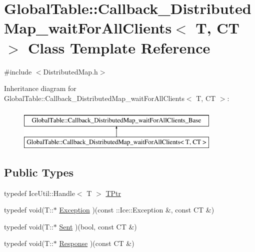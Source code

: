 \hypertarget{class_global_table_1_1_callback___distributed_map__wait_for_all_clients}{
\section{GlobalTable::Callback\_\-DistributedMap\_\-waitForAllClients$<$ T, CT $>$ Class Template Reference}
\label{class_global_table_1_1_callback___distributed_map__wait_for_all_clients}
}


{\ttfamily \#include $<$DistributedMap.h$>$}

Inheritance diagram for GlobalTable::Callback\_\-DistributedMap\_\-waitForAllClients$<$ T, CT $>$:\begin{figure}[H]
\begin{center}
\leavevmode
\includegraphics[height=2cm]{class_global_table_1_1_callback___distributed_map__wait_for_all_clients}
\end{center}
\end{figure}
\subsection*{Public Types}
\begin{DoxyCompactItemize}
\item 
typedef IceUtil::Handle$<$ T $>$ \hyperlink{class_global_table_1_1_callback___distributed_map__wait_for_all_clients_a0efb2e7297b9ccbba6e37fb4ce9a201e}{TPtr}
\item 
typedef void(T::$\ast$ \hyperlink{class_global_table_1_1_callback___distributed_map__wait_for_all_clients_a1e030c06ca5740affedcffb34ba857fc}{Exception} )(const ::Ice::Exception \&, const CT \&)
\item 
typedef void(T::$\ast$ \hyperlink{class_global_table_1_1_callback___distributed_map__wait_for_all_clients_ae931e7cc8794e1f268b0cc30db99f3d6}{Sent} )(bool, const CT \&)
\item 
typedef void(T::$\ast$ \hyperlink{class_global_table_1_1_callback___distributed_map__wait_for_all_clients_aba88f013404c18506ba6ad7bb0bf26bc}{Response} )(const CT \&)
\end{DoxyCompactItemize}
